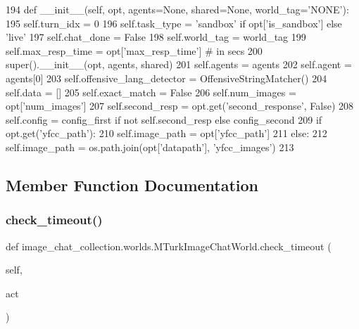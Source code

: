 \begin{DoxyCode}
194     \textcolor{keyword}{def }\_\_init\_\_(self, opt, agents=None, shared=None, world\_tag='NONE'):
195         self.turn\_idx = 0
196         self.task\_type = \textcolor{stringliteral}{'sandbox'} \textcolor{keywordflow}{if} opt[\textcolor{stringliteral}{'is\_sandbox'}] \textcolor{keywordflow}{else} \textcolor{stringliteral}{'live'}
197         self.chat\_done = \textcolor{keyword}{False}
198         self.world\_tag = world\_tag
199         self.max\_resp\_time = opt[\textcolor{stringliteral}{'max\_resp\_time'}]  \textcolor{comment}{# in secs}
200         super().\_\_init\_\_(opt, agents, shared)
201         self.agents = agents
202         self.agent = agents[0]
203         self.offensive\_lang\_detector = OffensiveStringMatcher()
204         self.data = []
205         self.exact\_match = \textcolor{keyword}{False}
206         self.num\_images = opt[\textcolor{stringliteral}{'num\_images'}]
207         self.second\_resp = opt.get(\textcolor{stringliteral}{'second\_response'}, \textcolor{keyword}{False})
208         self.config = config\_first \textcolor{keywordflow}{if} \textcolor{keywordflow}{not} self.second\_resp \textcolor{keywordflow}{else} config\_second
209         \textcolor{keywordflow}{if} opt.get(\textcolor{stringliteral}{'yfcc\_path'}):
210             self.image\_path = opt[\textcolor{stringliteral}{'yfcc\_path'}]
211         \textcolor{keywordflow}{else}:
212             self.image\_path = os.path.join(opt[\textcolor{stringliteral}{'datapath'}], \textcolor{stringliteral}{'yfcc\_images'})
213 
\end{DoxyCode}


\subsection{Member Function Documentation}
\mbox{\label{classimage__chat__collection_1_1worlds_1_1MTurkImageChatWorld_a333c8d7353ed7fba417461177035c209}} 
\subsubsection{\texorpdfstring{check\+\_\+timeout()}{check\_timeout()}}
{\footnotesize\ttfamily def image\+\_\+chat\+\_\+collection.\+worlds.\+M\+Turk\+Image\+Chat\+World.\+check\+\_\+timeout (\begin{DoxyParamCaption}\item[{}]{self,  }\item[{}]{act }\end{DoxyParamCaption})}



